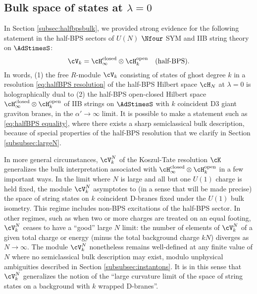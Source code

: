 \documentclass[a4paper,12pt]{article}
\begin{document}
\subsection{Bulk space of states at $\lambda = 0$} \label{subsec:generalbulkspace}


In Section \ref{subsec:halfbpsbulk}, we provided strong evidence for the following statement in the half-BPS sectors of $U(N)$ $\Nfour$ SYM and IIB string theory on $\AdStimesS$:
\begin{equation} \label{eq:halfBPS equality}
\cV_k = \cH_\infty^{\mathrm{closed}} \otimes \cH_k^{\mathrm{open}} \quad (\textrm{half-BPS}).
\end{equation}
In words, (1) the free $R$-module $\cV_k$ consisting of states of ghost degree $k$ in a resolution \eqref{eq:halfBPS resolution} of the half-BPS Hilbert space $\cH_N$ at $\lambda=0$ is holographically dual to (2) the half-BPS open-closed Hilbert space $\cH_\infty^{\mathrm{closed}} \otimes \cH_k^{\mathrm{open}}$ of IIB strings on $\AdStimesS$ with $k$ coincident D3 giant graviton branes, in the $\alpha' \to \infty$ limit. It is possible to make a statement such as \eqref{eq:halfBPS equality}, where there exists a sharp semiclassical bulk description, because of special properties of the half-BPS resolution that we clarify in Section \ref{subsubsec:largeN}.

In more general circumstances, $\cV_k^{N}$ of the Koszul-Tate resolution $\cK$ generalizes the bulk interpretation associated with $\cH_\infty^{\mathrm{closed}} \otimes \cH_k^{\mathrm{open}}$ in a few important ways. In the limit where $N$ is large and all but one $U(1)$ charge is held fixed, the module $\cV_k^N$ asymptotes to (in a sense that will be made precise) the space of string states on $k$ coincident D-branes fixed under the $U(1)$ bulk isometry. This regime includes non-BPS excitations of the half-BPS sector. In other regimes, such as when two or more charges are treated on an equal footing, $\cV_k^N$ ceases to have a ``good'' large $N$ limit: the number of elements of $\cV_k^N$ of a given total charge or energy (minus the total background charge $k N$) diverges as $N \to \infty$. The module $\cV_k^N$ nonetheless remains well-defined at any finite value of $N$ where no semiclassical bulk description may exist, modulo unphysical ambiguities described in Section \ref{subsubsec:instantons}. It is in this sense that $\cV_k^{N}$ generalizes the notion of the ``large curvature limit of the space of string states on a background with $k$ wrapped D-branes''.
\end{document}
